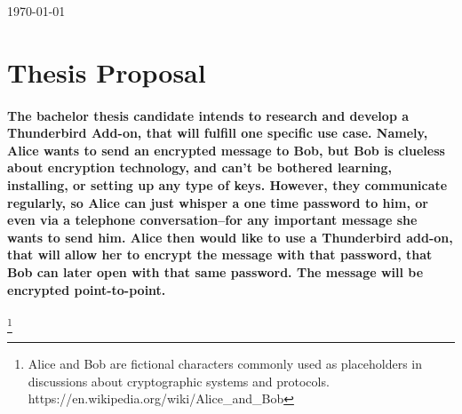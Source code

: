 \documentclass[12pt,a4paper]{article}
\begin{document}
\begin{titlepage}
	
	
	\vfill\vfill\vfill %
	
	{\large\today} %
	
	

	 
	
	\vfill %
	
\end{titlepage}

\section{Thesis Proposal} %

\paragraph{The bachelor thesis candidate intends to research and develop a Thunderbird Add-on, that will fulfill one specific use case. Namely, Alice wants to send an encrypted message to Bob, but Bob is clueless about encryption technology, and can't be bothered learning, installing, or setting up any type of keys. However, they communicate regularly, so Alice can just whisper a one time password to him, or even via a telephone conversation--for any important message she wants to send him. Alice then would like to use a Thunderbird add-on, that will allow her to encrypt the message with that password, that Bob can later open with that same password. The message will be encrypted point-to-point.}
\footnote{Alice and Bob are fictional characters commonly used as placeholders in discussions about cryptographic systems and protocols. https://en.wikipedia.org/wiki/Alice\_and\_Bob}
\end{document}
